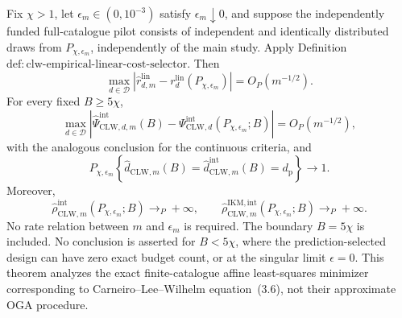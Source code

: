 Fix \(\chi>1\), let \(\epsilon_m\in(0,10^{-3})\) satisfy \(\epsilon_m\downarrow0\), and suppose the independently funded full-catalogue pilot consists of independent and identically distributed draws from \(P_{\chi,\epsilon_m}\), independently of the main study.  Apply Definition~\(\mathrm{def{:}clw\text{-}empirical\text{-}linear\text{-}cost\text{-}selector}\).  Then
\[
 \max_{d\in\mathcal D}
 \left|\widehat r_{d,m}^{\mathrm{lin}}
 -r_d^{\mathrm{lin}}(P_{\chi,\epsilon_m})\right|
 =O_P(m^{-1/2}).                                           \tag{1}
\]
For every fixed \(B\ge5\chi\),
\[
 \max_{d\in\mathcal D}
 \left|\widehat\Psi_{\mathrm{CLW},d,m}^{\mathrm{int}}(B)
 -\Psi_{\mathrm{CLW},d}^{\mathrm{int}}(P_{\chi,\epsilon_m};B)\right|
 =O_P(m^{-1/2}),                                           \tag{2}
\]
with the analogous conclusion for the continuous criteria, and
\[
 P_{\chi,\epsilon_m}\!\left\{
 \widehat d_{\mathrm{CLW},m}(B)
 =\widehat d_{\mathrm{CLW},m}^{\mathrm{int}}(B)
 =d_{\mathrm p}\right\}\longrightarrow1.                \tag{3}
\]
Moreover,
\[
 \widehat\rho_{\mathrm{CLW},m}^{\mathrm{int}}
 (P_{\chi,\epsilon_m};B)\longrightarrow_P+\infty,
 \qquad
 \widehat\rho_{\mathrm{CLW},m}^{\mathrm{IKM,int}}
 (P_{\chi,\epsilon_m};B)\longrightarrow_P+\infty.       \tag{4}
\]
No rate relation between \(m\) and \(\epsilon_m\) is required.  The boundary \(B=5\chi\) is included.  No conclusion is asserted for \(B<5\chi\), where the prediction-selected design can have zero exact budget count, or at the singular limit \(\epsilon=0\).  This theorem analyzes the exact finite-catalogue affine least-squares minimizer corresponding to Carneiro--Lee--Wilhelm equation~(3.6), not their approximate OGA procedure.